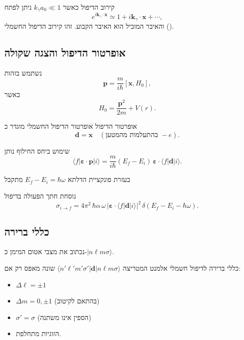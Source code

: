 \begin{resultbox}{קירוב הדיפול}
כאשר $k_\gamma a_0 \ll 1$ ניתן לפתח
\[
e^{i\mathbf{k}_\gamma\cdot\mathbf{x}}
\simeq
1 + i\mathbf{k}_\gamma\cdot\mathbf{x} + \cdots,
\]
והאיבר המוביל הוא האיבר הקבוע. זהו קירוב הדיפול החשמלי ().
\end{resultbox}

\subsection{אופרטור הדיפול והצגה שקולה}

נשתמש בזהות
\[
\mathbf{p} = \frac{m}{i\hbar}[\mathbf{x},H_0],
\]
כאשר
\[
H_0=\frac{\mathbf{p}^2}{2m}+V(r).
\]

\begin{definitionbox}{אופרטור הדיפול}
אופרטור הדיפול החשמלי מוגדר כ
\[
\mathbf{d}=\mathbf{x}
\quad
(\text{בהתעלמות מהמטען }-e).
\]
\end{definitionbox}

שימוש ביחס החילוף נותן
\[
\langle f|\boldsymbol{\varepsilon}\cdot\mathbf{p}|i\rangle
=
\frac{m}{i\hbar}
(E_f-E_i)
\,
\boldsymbol{\varepsilon}\cdot
\langle f|\mathbf{d}|i\rangle.
\]

בעזרת פונקציית הדלתא $E_f-E_i=\hbar\omega$ מתקבל

\begin{resultbox}{נוסחת חתך הפעולה בדיפול}
\[
\sigma_{i\to f}
=
4\pi^2
\,\hbar\alpha\,\omega\,
\left|
\boldsymbol{\varepsilon}\cdot
\langle f|\mathbf{d}|i\rangle
\right|^2
\,
\delta(E_f-E_i-\hbar\omega).
\]
\end{resultbox}

\subsection{כללי ברירה}

נכתוב את מצבי אטום המימן כ-$|n\ell m\sigma\rangle$.

\begin{theorembox}{כללי ברירה לדיפול חשמלי}
אלמנט המטריצה
$\langle n'\ell' m'\sigma'| \mathbf{d} |n\ell m\sigma\rangle$
שונה מאפס רק אם:
\begin{itemize}
\item $\Delta \ell = \pm 1$
\item $\Delta m = 0,\pm 1$ (בהתאם לקיטוב)
\item $\sigma'=\sigma$ (הספין אינו משתנה)
\item הזוגיות מתחלפת.
\end{itemize}
\end{theorembox}

